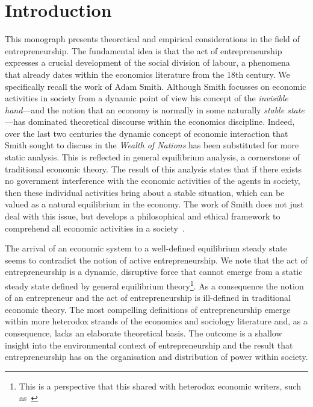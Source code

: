 \setcounter{page}{1} 
\chapter{Introduction}

This monograph presents theoretical and empirical considerations in the field of entrepreneurship. The fundamental idea is that the act of entrepreneurship expresses a crucial development of the social division of labour, a phenomena that already dates within the economics literature from the 18th century. We specifically recall the work of Adam Smith. Although Smith focusses on economic activities in society from a dynamic point of view his concept of the \emph{invisible hand}---and the notion that an economy is normally in some naturally \emph{stable state}---has dominated theoretical discourse within the economics discipline. Indeed, over the last two centuries the dynamic concept of economic interaction that Smith sought to discuss in the \emph{Wealth of Nations} has been substituted for more static analysis. This is reflected in general equilibrium analysis, a cornerstone of traditional economic theory. The result of this analysis states that if there exists no government interference with the economic activities of the agents in society, then these individual activities bring about a stable situation, which can be valued as a natural equilibrium in the economy. The work of Smith does not just deal with this issue, but develops a philosophical and ethical framework to comprehend all economic activities in a society~\citep{Gilles1990}.


The arrival of an economic system to a well-defined equilibrium steady state seems to contradict the notion of active entrepreneurship. We note that the act of entrepreneurship is a dynamic, disruptive force that cannot emerge from a static steady state defined by general equilibrium theory\footnote{This is a perspective that this shared with heterodox economic writers, such as~\citet{Schumpeter1942}}. As a consequence the notion of an entrepreneur and the act of entrepreneurship is ill-defined in traditional economic theory. The most compelling definitions of entrepreneurship emerge within more heterodox strands of the economics and sociology literature and, as a consequence, lacks an elaborate theoretical basis. The outcome is a shallow insight into the environmental context of entrepreneurship and the result that entrepreneurship has on the organisation and distribution of power within society.

